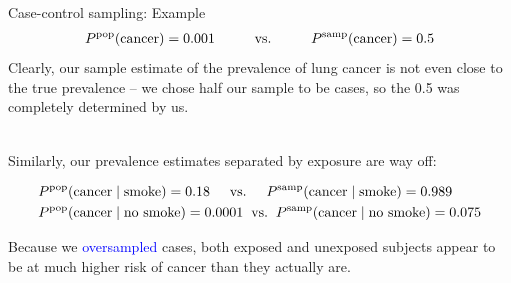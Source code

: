 \documentclass[10pt,t]{beamer}
\newcommand\tab[1][1cm]{\hspace*{#1}}
\begin{document}
\begin{frame}{Case-control sampling: Example}
	\vspace{-1cm}
	\begin{align*}
		P^{\text{pop}}(\text{cancer}) = 0.001 \tab \text{vs.} \tab P^{\text{samp}}(\text{cancer}) = 0.5
	\end{align*}
	Clearly, our sample estimate of the prevalence of lung cancer is not even close to the true prevalence -- we chose half our sample to be cases, so the 0.5 was completely determined by us.
	\\ ~\
	
	Similarly, our prevalence estimates separated by exposure are way off:
	\begin{small} 
	\begin{align*}
		&P^{\text{pop}}(\text{cancer} \mid \text{smoke}) = 0.18 \hspace{0.5cm} \text{vs.} \hspace{0.5cm} P^{\text{samp}}(\text{cancer}\mid \text{smoke}) = 0.989\\
		&P^{\text{pop}}(\text{cancer}\mid \text{no smoke}) = 0.0001 \hspace{0.2cm} \text{vs.} \hspace{0.2cm} P^{\text{samp}}(\text{cancer}\mid \text{no smoke}) = 0.075
	\end{align*}
	\end{small}
	Because we \textcolor{blue}{oversampled} cases, both exposed and unexposed subjects appear to be at much higher risk of cancer than they actually are. 
\end{frame}
\end{document}
